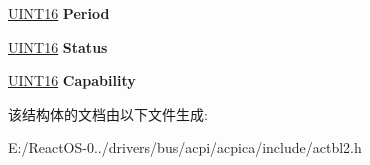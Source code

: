 \begin{DoxyCompactItemize}
\item 
\mbox{\label{structacpi__table__wddt_a06bce76049ca7d79b6a182f8399d09cf}} 
\hyperlink{_processor_bind_8h_a09f1a1fb2293e33483cc8d44aefb1eb1}{U\+I\+N\+T16} {\bfseries Period}
\item 
\mbox{\label{structacpi__table__wddt_a2f626c5929430e4b42ec0b9ae59f7c51}} 
\hyperlink{_processor_bind_8h_a09f1a1fb2293e33483cc8d44aefb1eb1}{U\+I\+N\+T16} {\bfseries Status}
\item 
\mbox{\label{structacpi__table__wddt_a2f559c8dc9f7e23dd4f1bff32ed78b8f}} 
\hyperlink{_processor_bind_8h_a09f1a1fb2293e33483cc8d44aefb1eb1}{U\+I\+N\+T16} {\bfseries Capability}
\end{DoxyCompactItemize}


该结构体的文档由以下文件生成\+:\begin{DoxyCompactItemize}
\item 
E\+:/\+React\+O\+S-\/0../drivers/bus/acpi/acpica/include/actbl2.\+h\end{DoxyCompactItemize}
